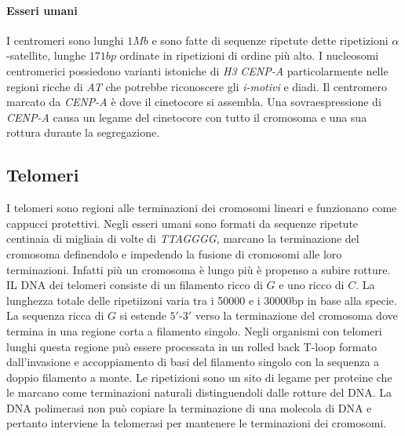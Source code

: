 \paragraph{Esseri umani} I centromeri sono lunghi $1Mb$ e sono fatte di sequenze ripetute dette ripetizioni $\alpha$-satellite, lunghe $171bp$ ordinate in ripetizioni di ordine pi\`u 
alto. I nucleosomi centromerici possiedono varianti istoniche di \emph{H3} \emph{CENP-A} particolarmente nelle regioni ricche di \emph{AT} che potrebbe riconoscere gli \emph{i-motivi}
e diadi. Il centromero marcato da \emph{CENP-A} \`e dove il cinetocore si assembla. Una sovraespressione di \emph{CENP-A} causa un legame del cinetocore con tutto il cromosoma e una
sua rottura durante la segregazione. 
\subsection{Telomeri}
I telomeri sono regioni alle terminazioni dei cromosomi lineari e funzionano come cappucci protettivi. Negli esseri umani sono formati da sequenze ripetute centinaia di migliaia di 
volte di \emph{TTAGGGG}, marcano la terminazione del cromosoma definendolo e impedendo la fusione di cromosomi alle loro terminazioni. Infatti pi\`u un cromosoma \`e lungo pi\`u 
\`e propenso a subire rotture. IL DNA dei telomeri consiste di un filamento ricco di $G$ e uno ricco di $C$. La lunghezza totale delle ripetiizoni varia tra i \num{50000} e i 
\num{30000}\si{bp} in base alla specie. La sequenza ricca di $G$ si estende $5'$-$3'$ verso la terminazione del cromosoma dove termina in una regione corta a filamento singolo. 
Negli organismi con telomeri lunghi questa regione pu\`o essere processata in un rolled back T-loop formato dall'invasione e accoppiamento di basi del filamento singolo con la
sequenza a doppio filamento a monte. Le ripetizioni sono un sito di legame per proteine che le marcano come terminazioni naturali distinguendoli dalle rotture del DNA. La DNA 
polimerasi non pu\`o copiare la terminazione di una molecola di DNA e pertanto interviene la telomerasi per mantenere le terminazioni dei cromosomi. 

